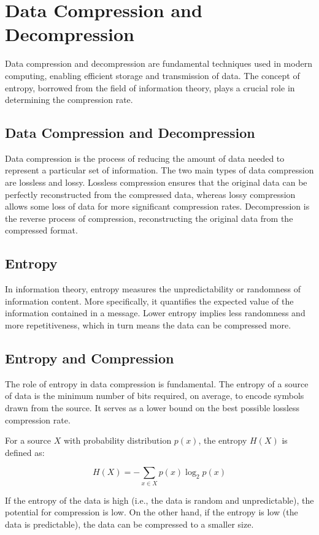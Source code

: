 \chapter{Data Compression and Decompression}

Data compression and decompression are fundamental techniques used in
modern computing, enabling efficient storage and transmission of
data. The concept of entropy, borrowed from the field of information
theory, plays a crucial role in determining the compression rate.

\section{Data Compression and Decompression}

Data compression is the process of reducing the amount of data needed
to represent a particular set of information. The two main types of
data compression are lossless and lossy. Lossless compression ensures
that the original data can be perfectly reconstructed from the
compressed data, whereas lossy compression allows some loss of data
for more significant compression rates.
Decompression is the reverse process of compression, reconstructing
the original data from the compressed format.

\section{Entropy}

In information theory, entropy measures the unpredictability or
randomness of information content. More specifically, it quantifies
the expected value of the information contained in a message. Lower
entropy implies less randomness and more repetitiveness, which in turn
means the data can be compressed more.

\section{Entropy and Compression}

The role of entropy in data compression is fundamental. The entropy of
a source of data is the minimum number of bits required, on average,
to encode symbols drawn from the source. It serves as a lower bound on
the best possible lossless compression rate.

For a source $X$ with probability distribution $p(x)$, the entropy $H(X)$ is defined as:

\begin{equation}
H(X) = - \sum_{x \in X} p(x) \log_2 p(x)
\end{equation}

If the entropy of the data is high (i.e., the data is random and
unpredictable), the potential for compression is low. On the other
hand, if the entropy is low (the data is predictable), the data can be
compressed to a smaller size.

